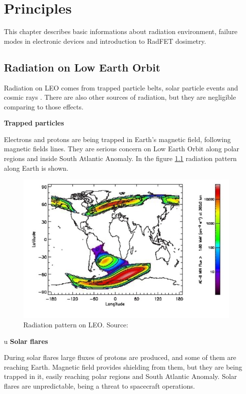 \chapter{Principles}

This chapter describes basic informations about radiation environment, failure modes in electronic devices and introduction to RadFET dosimetry.

\section{Radiation on Low Earth Orbit}
    Radiation on LEO comes from trapped particle belts, solar particle events and cosmic rays \cite{ESA_radiation}. There are also other sources of radiation, but they are negligible comparing to those effects.

    \bigskip \textbf{Trapped particles}

    Electrons and protons are being trapped in Earth's magnetic field, following magnetic fields lines. They are serious concern on Low Earth Orbit along polar regions and inside South Atlantic Anomaly. In the figure \ref{Polar_SAA} radiation pattern along Earth is shown.

    \begin{figure}[H]
        \centering
        \includegraphics[width=0.6\paperwidth]{img/03/polar_SAA.png}
        \caption{Radiation pattern on LEO. Source: \cite{ESA_radiation}}
         \label{Polar_SAA}
    \end{figure}

u    \bigskip \textbf{Solar flares}

    During solar flares large fluxes of protons are produced, and some of them are reaching Earth. Magnetic field provides shielding from them, but they are being trapped in it, easily reaching polar regions and South Atlantic Anomaly. Solar flares are unpredictable, being a threat to spacecraft operations.

